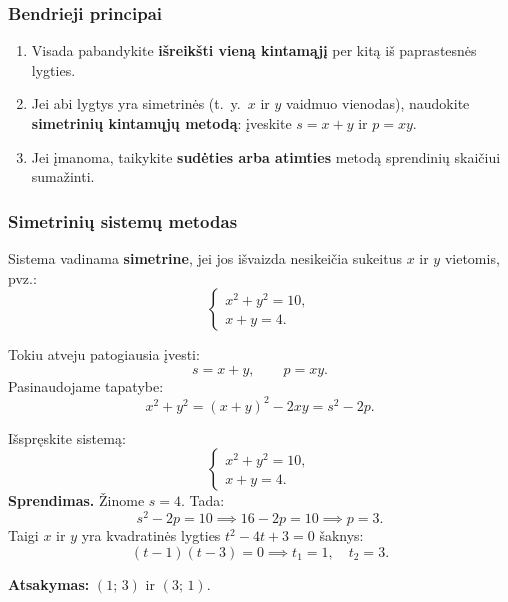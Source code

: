 \subsubsection*{Bendrieji principai}

\begin{enumerate}[label=\arabic*.]
  \item Visada pabandykite \textbf{išreikšti vieną kintamąjį} per kitą iš paprastesnės lygties.
  \item Jei abi lygtys yra simetrinės (t.~y.\ $x$ ir $y$ vaidmuo vienodas), naudokite \textbf{simetrinių kintamųjų metodą}: įveskite $s = x+y$ ir $p = xy$.
  \item Jei įmanoma, taikykite \textbf{sudėties arba atimties} metodą sprendinių skaičiui sumažinti.
\end{enumerate}

\subsubsection*{Simetrinių sistemų metodas}

\begin{definition}
Sistema vadinama \textbf{simetrine}, jei jos išvaizda nesikeičia sukeitus $x$ ir $y$ vietomis, pvz.:
\[
  \begin{cases}
    x^2 + y^2 = 10,\\
    x + y = 4.
  \end{cases}
\]
\end{definition}

Tokiu atveju patogiausia įvesti:
\[
  s = x + y, \qquad p = xy.
\]
Pasinaudojame tapatybe:
\[
  x^2 + y^2 = (x+y)^2 - 2xy = s^2 - 2p.
\]

\begin{example}
Išspręskite sistemą:
\[
  \begin{cases}
    x^2 + y^2 = 10,\\
    x + y = 4.
  \end{cases}
\]
\textbf{Sprendimas.} Žinome $s = 4$. Tada:
\[
  s^2 - 2p = 10 \implies 16 - 2p = 10 \implies p = 3.
\]
Taigi $x$ ir $y$ yra kvadratinės lygties $t^2 - 4t + 3 = 0$ šaknys:
\[
  (t-1)(t-3) = 0 \implies t_1 = 1,\quad t_2 = 3.
\]

\textbf{Atsakymas:} $(1;\,3)$ ir $(3;\,1)$.
\end{example}

